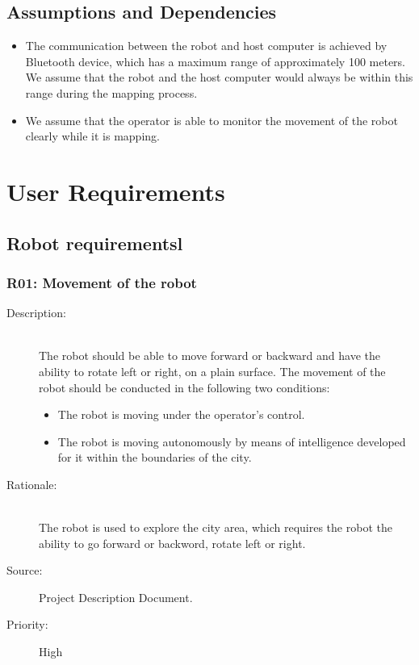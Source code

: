 \documentclass[titlepage]{article}
\begin{document}
\subsection{Assumptions and Dependencies}
\begin{itemize}
\item The communication between the robot and host computer is achieved by Bluetooth device, which has a maximum range of approximately 100 meters. We assume that the robot and the host computer would always be within this range during the mapping process.
\item We assume that the operator is able to monitor the movement of the robot clearly while it is mapping.
\end{itemize}







\newpage



 \section{User Requirements}
 \subsection{Robot requirementsl} %
\subsubsection{R01: Movement of the robot }
\begin{description}
\item[Description: ] \hfill \\ The robot should be able to move forward or backward and have the ability to rotate left or right, on a plain surface.
The movement of the robot should be conducted in the following two conditions:

\begin{itemize}
\item The robot is moving under the operator’s control.
\item The robot is moving autonomously by means of intelligence developed for it within the boundaries of the city.
\end{itemize}

\item[Rationale: ] \hfill \\The robot is used to explore the city area, which requires the robot the ability to go forward or backword, rotate left or right.
\item[Source: ] Project Description Document.
\item[Priority: ] High
\end{description}
\end{document}
